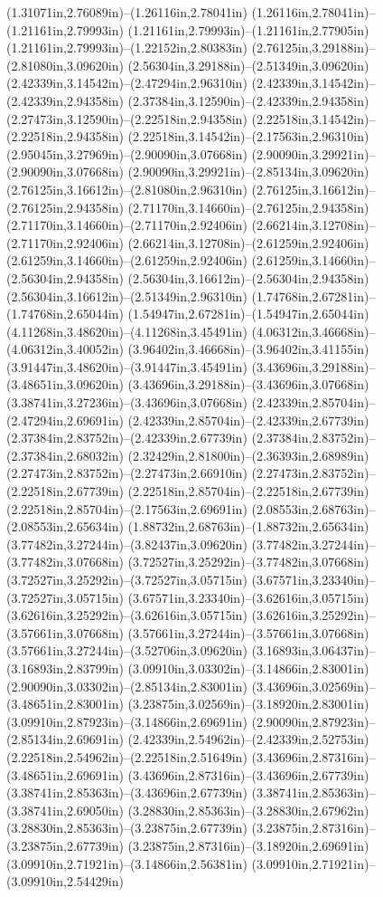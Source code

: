 (1.31071in,2.76089in)--(1.26116in,2.78041in) (1.26116in,2.78041in)--(1.21161in,2.79993in) (1.21161in,2.79993in)--(1.21161in,2.77905in) (1.21161in,2.79993in)--(1.22152in,2.80383in) (2.76125in,3.29188in)--(2.81080in,3.09620in) (2.56304in,3.29188in)--(2.51349in,3.09620in) (2.42339in,3.14542in)--(2.47294in,2.96310in) (2.42339in,3.14542in)--(2.42339in,2.94358in) (2.37384in,3.12590in)--(2.42339in,2.94358in) (2.27473in,3.12590in)--(2.22518in,2.94358in) (2.22518in,3.14542in)--(2.22518in,2.94358in) (2.22518in,3.14542in)--(2.17563in,2.96310in) (2.95045in,3.27969in)--(2.90090in,3.07668in) (2.90090in,3.29921in)--(2.90090in,3.07668in) (2.90090in,3.29921in)--(2.85134in,3.09620in) (2.76125in,3.16612in)--(2.81080in,2.96310in) (2.76125in,3.16612in)--(2.76125in,2.94358in) (2.71170in,3.14660in)--(2.76125in,2.94358in) (2.71170in,3.14660in)--(2.71170in,2.92406in) (2.66214in,3.12708in)--(2.71170in,2.92406in) (2.66214in,3.12708in)--(2.61259in,2.92406in) (2.61259in,3.14660in)--(2.61259in,2.92406in) (2.61259in,3.14660in)--(2.56304in,2.94358in) (2.56304in,3.16612in)--(2.56304in,2.94358in) (2.56304in,3.16612in)--(2.51349in,2.96310in) (1.74768in,2.67281in)--(1.74768in,2.65044in) (1.54947in,2.67281in)--(1.54947in,2.65044in) (4.11268in,3.48620in)--(4.11268in,3.45491in) (4.06312in,3.46668in)--(4.06312in,3.40052in) (3.96402in,3.46668in)--(3.96402in,3.41155in) (3.91447in,3.48620in)--(3.91447in,3.45491in) (3.43696in,3.29188in)--(3.48651in,3.09620in) (3.43696in,3.29188in)--(3.43696in,3.07668in) (3.38741in,3.27236in)--(3.43696in,3.07668in) (2.42339in,2.85704in)--(2.47294in,2.69691in) (2.42339in,2.85704in)--(2.42339in,2.67739in) (2.37384in,2.83752in)--(2.42339in,2.67739in) (2.37384in,2.83752in)--(2.37384in,2.68032in) (2.32429in,2.81800in)--(2.36393in,2.68989in) (2.27473in,2.83752in)--(2.27473in,2.66910in) (2.27473in,2.83752in)--(2.22518in,2.67739in) (2.22518in,2.85704in)--(2.22518in,2.67739in) (2.22518in,2.85704in)--(2.17563in,2.69691in) (2.08553in,2.68763in)--(2.08553in,2.65634in) (1.88732in,2.68763in)--(1.88732in,2.65634in) (3.77482in,3.27244in)--(3.82437in,3.09620in) (3.77482in,3.27244in)--(3.77482in,3.07668in) (3.72527in,3.25292in)--(3.77482in,3.07668in) (3.72527in,3.25292in)--(3.72527in,3.05715in) (3.67571in,3.23340in)--(3.72527in,3.05715in) (3.67571in,3.23340in)--(3.62616in,3.05715in) (3.62616in,3.25292in)--(3.62616in,3.05715in) (3.62616in,3.25292in)--(3.57661in,3.07668in) (3.57661in,3.27244in)--(3.57661in,3.07668in) (3.57661in,3.27244in)--(3.52706in,3.09620in) (3.16893in,3.06437in)--(3.16893in,2.83799in) (3.09910in,3.03302in)--(3.14866in,2.83001in) (2.90090in,3.03302in)--(2.85134in,2.83001in) (3.43696in,3.02569in)--(3.48651in,2.83001in) (3.23875in,3.02569in)--(3.18920in,2.83001in) (3.09910in,2.87923in)--(3.14866in,2.69691in) (2.90090in,2.87923in)--(2.85134in,2.69691in) (2.42339in,2.54962in)--(2.42339in,2.52753in) (2.22518in,2.54962in)--(2.22518in,2.51649in) (3.43696in,2.87316in)--(3.48651in,2.69691in) (3.43696in,2.87316in)--(3.43696in,2.67739in) (3.38741in,2.85363in)--(3.43696in,2.67739in) (3.38741in,2.85363in)--(3.38741in,2.69050in) (3.28830in,2.85363in)--(3.28830in,2.67962in) (3.28830in,2.85363in)--(3.23875in,2.67739in) (3.23875in,2.87316in)--(3.23875in,2.67739in) (3.23875in,2.87316in)--(3.18920in,2.69691in) (3.09910in,2.71921in)--(3.14866in,2.56381in) (3.09910in,2.71921in)--(3.09910in,2.54429in) 